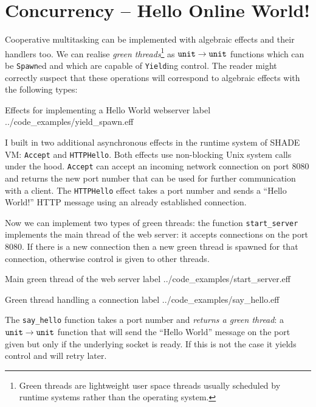 \documentclass[class=article, crop=false]{standalone}
\begin{document}
\section{Concurrency -- Hello Online World!}

Cooperative multitasking can be implemented with algebraic effects and their
handlers too. We can realise \emph{green threads}\footnote{Green threads are
lightweight user space threads usually scheduled by runtime systems rather
than the operating system.} as $\mathtt{unit} \to \mathtt{unit}$
functions which can be \lstinline|Spawn|ed and which are capable
of \lstinline|Yield|ing control. The reader might correctly suspect that
these operations will correspond to algebraic effects with the following types:

{Effects for implementing a Hello World webserver}
{label}
{../code_examples/yield_spawn.eff}

I built in two additional asynchronous effects in the runtime system of
SHADE VM: \verb|Accept| and \verb|HTTPHello|.
Both effects use non-blocking Unix system calls under the hood.
\verb|Accept| can accept an incoming network connection on port 8080 and returns
the new port number that can be used for further communication with a client.
The \verb|HTTPHello| effect takes a port number and sends a ``Hello World!''
HTTP message using an already established connection.

Now we can implement two types of green threads: the function
\lstinline|start_server| implements the main thread of the web server: it
accepts connections on the port 8080. If there is a new connection then a new
green thread is spawned for that connection, otherwise control is given to other
threads.

{Main green thread of the web server}
{label}
{../code_examples/start_server.eff}

{Green thread handling a connection}
{label}
{../code_examples/say_hello.eff}

The \lstinline{say_hello} function takes a port number and
\emph{returns a green thread}: a $\mathtt{unit} \to \mathtt{unit}$ function that will
send the ``Hello World'' message on the port given but only if the underlying
socket is ready. If this is not the case it yields control and will retry later.
\end{document}

